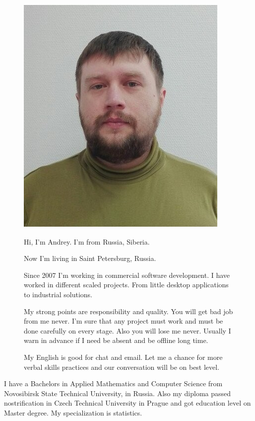 \documentclass[letterpaper,11pt]{article}
\begin{document}
\begin{figure}[h!]
  \begin{minipage}[h!]{.2\textwidth}
    \includegraphics[scale=0.25]{AndreiShestakov0.png}
  \end{minipage}
  \hfil
  \begin{minipage}[h!]{0.8\textwidth}

Hi, I'm Andrey. I'm from Russia, Siberia.

Now I'm living in Saint Petersburg, Russia.

Since 2007 I'm working in commercial software development. I have worked in different scaled projects. From little desktop applications to industrial solutions.

My strong points are responsibility and quality. You will get bad job from me never. I'm sure that any project must work and must be done carefully on every stage. Also you will lose me never. Usually I warn in advance if I need be absent and be offline long time.

My English is good for chat and email. Let me a chance for more verbal skills practices and our conversation will be on best level.
  \end{minipage}
\end{figure}

I have a Bachelors in Applied Mathematics and Computer Science from Novosibirsk State Technical University, in Russia. Also my diploma passed nostrification in Czech Technical University in Prague and got education level on Master degree. My specialization is statistics.
\end{document}
